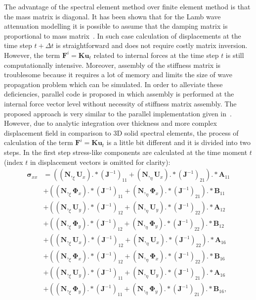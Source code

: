 \documentclass[preprint,12pt]{elsarticle}
\renewcommand{\vec}[1]{\mathbf{#1}}
\renewcommand{\bm}[1]{\mathbf{#1}}
\newcommand{\bs}[1]{\boldsymbol{#1}}
\begin{document}
	The advantage of the spectral element method over finite element method is that the mass matrix is diagonal. It has been shown that for the Lamb wave attenuation modelling it is possible to assume that the damping matrix is proportional to mass matrix~\cite{Wandowski2017}. In such case calculation of displacements at the time step $t + \Delta t$ is straightforward and does not require costly matrix inversion. However, the term $\vec{F}^i=\bm{K}\vec{u}_t$ related to internal forces at the time step $t$ is still computationally intensive. Moreover, assembly of the stiffness matrix is troublesome because it requires a lot of memory and limits the size of wave propagation problem which can be simulated. In order to alleviate these deficiencies, parallel code is proposed in which assembly is performed at the internal force vector level without necessity of stiffness matrix assembly. The proposed approach is very similar to the parallel implementation given in~\cite{Kudela2016}. However, due to analytic integration over thickness and more complex displacement field in comparison to 3D solid spectral elements, the process of calculation of the term $\vec{F}^i=\bm{K}\vec{u}_t$ is a little bit different and it is divided into two steps. In the first step stress-like components are calculated at the time moment $t$ (index $t$ in displacement vectors is omitted for clarity):
	\begin{equation}
	\begin{split}
	\bs{\sigma}_{xx}&=\left((\bm{N},_{\xi}\vec{U}_x).*(\vec{J}^{-1})_{11}+(\bm{N},_{\eta}\vec{U}_x).*(\vec{J}^{-1})_{21}\right).*\vec{A}_{11}\\
	&+\left((\bm{N},_{\xi}\bs{\Phi}_x).*(\vec{J}^{-1})_{11}+(\bm{N},_{\eta}\bs{\Phi}_x).*(\vec{J}^{-1})_{21}\right).*\vec{B}_{11}\\
	&+\left((\bm{N},_{\xi}\vec{U}_y).*(\vec{J}^{-1})_{12}+(\bm{N},_{\eta}\vec{U}_y).*(\vec{J}^{-1})_{22}\right).*\vec{A}_{12}\\
	&+\left((\bm{N},_{\xi}\bs{\Phi}_y).*(\vec{J}^{-1})_{12}+(\bm{N},_{\eta}\bs{\Phi}_y).*(\vec{J}^{-1})_{22}\right).*\vec{B}_{12}\\
	&+\left((\bm{N},_{\xi}\vec{U}_x).*(\vec{J}^{-1})_{12}+(\bm{N},_{\eta}\vec{U}_x).*(\vec{J}^{-1})_{22}\right).*\vec{A}_{16}\\
	&+\left((\bm{N},_{\xi}\bs{\Phi}_x).*(\vec{J}^{-1})_{12}+(\bm{N},_{\eta}\bs{\Phi}_x).*(\vec{J}^{-1})_{22}\right).*\vec{B}_{16}\\
	&+\left((\bm{N},_{\xi}\vec{U}_y).*(\vec{J}^{-1})_{11}+(\bm{N},_{\eta}\vec{U}_y).*(\vec{J}^{-1})_{21}\right).*\vec{A}_{16}\\
	&+\left((\bm{N},_{\xi}\bs{\Phi}_y).*(\vec{J}^{-1})_{11}+(\bm{N},_{\eta}\bs{\Phi}_y).*(\vec{J}^{-1})_{21}\right).*\vec{B}_{16},
	\end{split}
	\end{equation}
\end{document}
